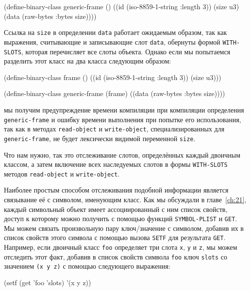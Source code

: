 \begin{myverb}
(define-binary-class generic-frame ()
  ((id (iso-8859-1-string :length 3))
   (size u3)
   (data (raw-bytes :bytes size))))
\end{myverb}

Ссылка на \lstinline{size} в определении \lstinline{data} работает ожидаемым образом, так как
выражения, считывающие и записывающие слот \lstinline{data}, обернуты формой
\lstinline{WITH-SLOTS}, которая перечисляет все слоты объекта. Однако если мы попытаемся
разделить этот класс на два класса следующим образом:

\begin{myverb}
(define-binary-class frame ()
  ((id (iso-8859-1-string :length 3))
   (size u3)))

(define-binary-class generic-frame (frame)
  ((data (raw-bytes :bytes size))))
\end{myverb}

\noindent{}мы получим предупреждение времени компиляции при компиляции определения
\lstinline{generic-frame} и ошибку времени выполнения при попытке его использования, так как в
методах \lstinline{read-object} и \lstinline{write-object}, специализированных для
\lstinline{generic-frame}, не будет лексически видимой переменной \lstinline{size}.

Что нам нужно, так это отслеживание слотов, определённых каждый двоичным классом, а затем
включение всех наследуемых слотов в формы \lstinline{WITH-SLOTS} методов \lstinline{read-object} и
\lstinline{write-object}.

Наиболее простым способом отслеживания подобной информации является связывание её с
символом, именующим класс. Как мы обсуждали в главе~\ref{ch:21}, каждый символьный объект
имеет ассоциированный с ним список свойств, доступ к которому можно получить с помощью
функций \lstinline{SYMBOL-PLIST} и \lstinline{GET}. Мы можем связать произвольную пару
ключ/значение с символом, добавив их в список свойств этого символа с помощью вызова
\lstinline{SETF} для результата \lstinline{GET}. Например, если двоичный класс \lstinline{foo}
определяет три слота \lstinline{x}, \lstinline{y} и \lstinline{z}, мы можем отследить этот факт, добавив
в список свойств символа \lstinline{foo} ключ \lstinline{slots} со значением \lstinline{(x y z)} с
помощью следующего выражения:

\begin{myverb}
(setf (get 'foo 'slots) '(x y z))
\end{myverb}

